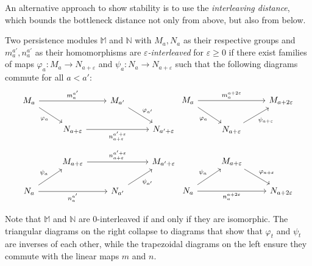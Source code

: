 An alternative approach to show stability is to use the \emph{interleaving
distance}, which bounds the bottleneck distance not only from above, but also
from below.
\begin{definition}
    \label{def:interleaving}
    Two persistence modules $\mathbb{M}$ and $\mathbb{N}$ with $M_a, N_a$ as
    their respective groups and $m_a^{a'}, n_a^{a'}$ as their homomorphisms
    are \emph{$\varepsilon$-interleaved}
    for $\varepsilon \geq 0$ if there exist families of maps $\varphi_a : M_a
    \to N_{a + \varepsilon}$ and $\psi_a : N_a \to N_{a + \varepsilon}$
    such that the following diagrams commute for all $a < a'$:
    \begin{equation*}
        \begin{tikzcd}
            M_a \arrow{rr}{m_a^{a'}} \arrow{dr}[swap]{\varphi_a} & & M_{a'} \arrow{dr}{\varphi_{a'}} \\
            & N_{a + \varepsilon} \arrow{rr}[swap]{n_{a + \varepsilon}^{a' + \varepsilon}} & & N_{a' + \varepsilon}
        \end{tikzcd}
        \begin{tikzcd}
            M_a \arrow{dr}[swap]{\varphi_a} \arrow{rr}{m_a^{a + 2\varepsilon}} && M_{a + 2\varepsilon} \\
            & N_{a + \varepsilon} \arrow{ur}[swap]{\psi_{a + \varepsilon}}
        \end{tikzcd}
    \end{equation*}
    \begin{equation*}
        \begin{tikzcd}
            & M_{a + \varepsilon} \arrow{rr}{n_{a + \varepsilon}^{a' + \varepsilon}} & & M_{a' + \varepsilon} \\
            N_a \arrow{rr}[swap]{n_a^{a'}} \arrow{ur}{\psi_a} & & N_{a'} \arrow{ur}[swap]{\psi_{a'}}
        \end{tikzcd}
        \begin{tikzcd}
            & M_{a + \varepsilon} \arrow{dr}{\varphi_{a + \varepsilon}} \\
            N_a \arrow{ur}{\psi_a} \arrow{rr}[swap]{n_a^{a + 2\varepsilon}} && N_{a + 2\varepsilon}
        \end{tikzcd}
    \end{equation*}
\end{definition}
Note that $\mathbb{M}$ and $\mathbb{N}$ are $0$-interleaved if and only if
they are isomorphic. The triangular diagrams on the right collapse to diagrams
that show that $\varphi_t$ and $\psi_t$ are inverses of each other, while
the trapezoidal diagrams on the left ensure they commute with the linear maps
$m$ and $n$.

